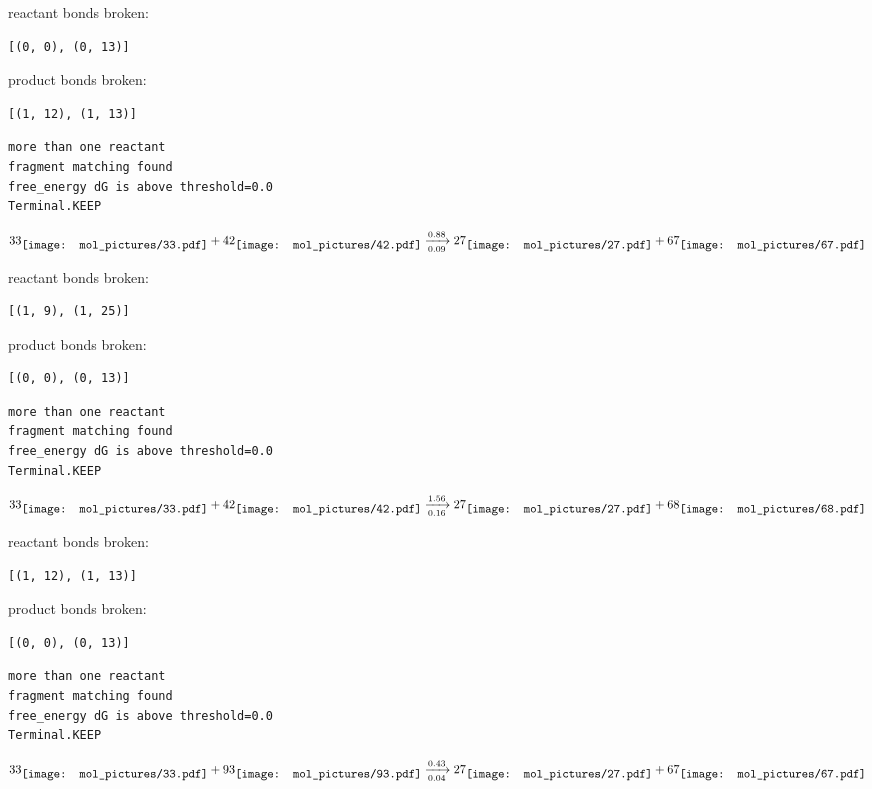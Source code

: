 \documentclass{article}
\begin{document}
reactant bonds broken:\begin{verbatim}
[(0, 0), (0, 13)]
\end{verbatim}
product bonds broken:\begin{verbatim}
[(1, 12), (1, 13)]
\end{verbatim}




\vspace{1cm}
\begin{verbatim}
more than one reactant
fragment matching found
free_energy dG is above threshold=0.0
Terminal.KEEP
\end{verbatim}
$$
33
\raisebox{-.5\height}{\texttt{[image: mol\_pictures/33.pdf]}}
+
42
\raisebox{-.5\height}{\texttt{[image: mol\_pictures/42.pdf]}}
\xrightarrow[0.09]{0.88}
27
\raisebox{-.5\height}{\texttt{[image: mol\_pictures/27.pdf]}}
+
67
\raisebox{-.5\height}{\texttt{[image: mol\_pictures/67.pdf]}}
$$


reactant bonds broken:\begin{verbatim}
[(1, 9), (1, 25)]
\end{verbatim}
product bonds broken:\begin{verbatim}
[(0, 0), (0, 13)]
\end{verbatim}




\vspace{1cm}
\begin{verbatim}
more than one reactant
fragment matching found
free_energy dG is above threshold=0.0
Terminal.KEEP
\end{verbatim}
$$
33
\raisebox{-.5\height}{\texttt{[image: mol\_pictures/33.pdf]}}
+
42
\raisebox{-.5\height}{\texttt{[image: mol\_pictures/42.pdf]}}
\xrightarrow[0.16]{1.56}
27
\raisebox{-.5\height}{\texttt{[image: mol\_pictures/27.pdf]}}
+
68
\raisebox{-.5\height}{\texttt{[image: mol\_pictures/68.pdf]}}
$$


reactant bonds broken:\begin{verbatim}
[(1, 12), (1, 13)]
\end{verbatim}
product bonds broken:\begin{verbatim}
[(0, 0), (0, 13)]
\end{verbatim}




\vspace{1cm}
\begin{verbatim}
more than one reactant
fragment matching found
free_energy dG is above threshold=0.0
Terminal.KEEP
\end{verbatim}
$$
33
\raisebox{-.5\height}{\texttt{[image: mol\_pictures/33.pdf]}}
+
93
\raisebox{-.5\height}{\texttt{[image: mol\_pictures/93.pdf]}}
\xrightarrow[0.04]{0.43}
27
\raisebox{-.5\height}{\texttt{[image: mol\_pictures/27.pdf]}}
+
67
\raisebox{-.5\height}{\texttt{[image: mol\_pictures/67.pdf]}}
$$
\end{document}
